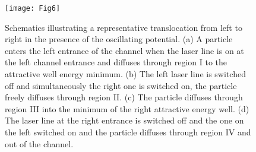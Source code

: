 \documentclass[
 reprint,
 aps, showkeys, showpacs
]{revtex4-1}
\begin{document}
\begin{figure}
	\texttt{[image: Fig6]}
	\caption{\label{Fig6} Schematics illustrating a representative translocation from left to right in the presence of the oscillating potential. (a) A particle enters the left entrance of the channel when the laser line is on at the left channel entrance and diffuses through region I to the attractive well energy minimum. (b) The left laser line is switched off and simultaneously the right one is switched on, the particle freely diffuses through region II. (c) The particle diffuses through region III into the minimum of the right attractive energy well. (d) The laser line at the right entrance is switched off and the one on the left switched on and the particle diffuses through region IV and out of the channel.}
\end{figure}
\end{document}
